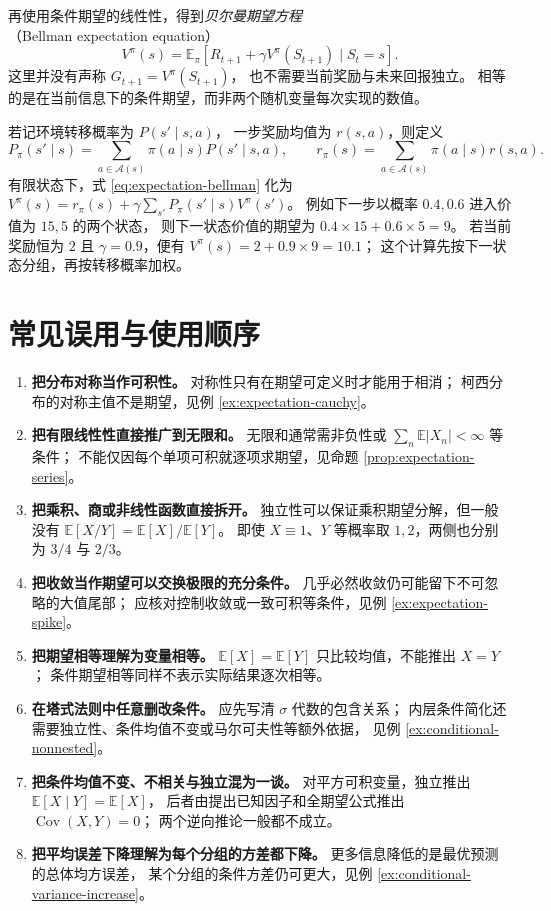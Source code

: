 \documentclass[UTF8,12pt,a4paper,fontset=fandol]{ctexart}
\begin{document}
再使用条件期望的线性性，得到\emph{贝尔曼期望方程}
（Bellman expectation equation）
\begin{equation}
  V^\pi(s)
  =\mathbb E_\pi[R_{t+1}+\gamma V^\pi(S_{t+1})\mid S_t=s].
  \label{eq:expectation-bellman}
\end{equation}
这里并没有声称 $G_{t+1}=V^\pi(S_{t+1})$，
也不需要当前奖励与未来回报独立。
相等的是在当前信息下的条件期望，而非两个随机变量每次实现的数值。

若记环境转移概率为 $P(s'\mid s,a)$，
一步奖励均值为 $r(s,a)$，则定义
\[
  P_\pi(s'\mid s)=\sum_{a\in\mathcal A(s)}\pi(a\mid s)P(s'\mid s,a),
  \qquad
  r_\pi(s)=\sum_{a\in\mathcal A(s)}\pi(a\mid s)r(s,a).
\]
有限状态下，式 \eqref{eq:expectation-bellman} 化为
$V^\pi(s)=r_\pi(s)+\gamma\sum_{s'}P_\pi(s'\mid s)V^\pi(s')$。
例如下一步以概率 $0.4,0.6$ 进入价值为 $15,5$ 的两个状态，
则下一状态价值的期望为 $0.4\times15+0.6\times5=9$。
若当前奖励恒为 $2$ 且 $\gamma=0.9$，便有 $V^\pi(s)=2+0.9\times9=10.1$；
这个计算先按下一状态分组，再按转移概率加权。

\section{常见误用与使用顺序}
\label{sec:expectation-pitfalls}

\begin{enumerate}
  \item \textbf{把分布对称当作可积性。}
  对称性只有在期望可定义时才能用于相消；
  柯西分布的对称主值不是期望，见例 \ref{ex:expectation-cauchy}。
  \item \textbf{把有限线性性直接推广到无限和。}
  无限和通常需非负性或 $\sum_n\mathbb E|X_n|<\infty$ 等条件；
  不能仅因每个单项可积就逐项求期望，见命题 \ref{prop:expectation-series}。
  \item \textbf{把乘积、商或非线性函数直接拆开。}
  独立性可以保证乘积期望分解，但一般没有
  $\mathbb E[X/Y]=\mathbb E[X]/\mathbb E[Y]$。
  即使 $X\equiv1$、$Y$ 等概率取 $1,2$，两侧也分别为 $3/4$ 与 $2/3$。
  \item \textbf{把收敛当作期望可以交换极限的充分条件。}
  几乎必然收敛仍可能留下不可忽略的大值尾部；
  应核对控制收敛或一致可积等条件，见例 \ref{ex:expectation-spike}。
  \item \textbf{把期望相等理解为变量相等。}
  $\mathbb E[X]=\mathbb E[Y]$ 只比较均值，不能推出 $X=Y$；
  条件期望相等同样不表示实际结果逐次相等。
  \item \textbf{在塔式法则中任意删改条件。}
  应先写清 $\sigma$ 代数的包含关系；
  内层条件简化还需要独立性、条件均值不变或马尔可夫性等额外依据，
  见例 \ref{ex:conditional-nonnested}。
  \item \textbf{把条件均值不变、不相关与独立混为一谈。}
  对平方可积变量，独立推出 $\mathbb E[X\mid Y]=\mathbb E[X]$，
  后者由提出已知因子和全期望公式推出 $\operatorname{Cov}(X,Y)=0$；
  两个逆向推论一般都不成立。
  \item \textbf{把平均误差下降理解为每个分组的方差都下降。}
  更多信息降低的是最优预测的总体均方误差，
  某个分组的条件方差仍可更大，见例 \ref{ex:conditional-variance-increase}。
\end{enumerate}
\end{document}
